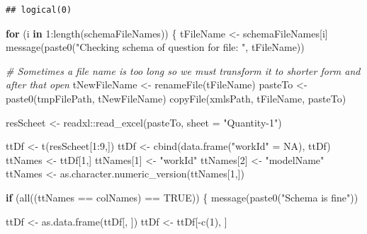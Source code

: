 \documentclass[
]{article}
\newenvironment{Shaded}{\begin{snugshade}}{\end{snugshade}}
\newcommand{\AttributeTok}[1]{\textcolor[rgb]{0.77,0.63,0.00}{#1}}
\newcommand{\CommentTok}[1]{\textcolor[rgb]{0.56,0.35,0.01}{\textit{#1}}}
\newcommand{\ConstantTok}[1]{\textcolor[rgb]{0.00,0.00,0.00}{#1}}
\newcommand{\ControlFlowTok}[1]{\textcolor[rgb]{0.13,0.29,0.53}{\textbf{#1}}}
\newcommand{\DecValTok}[1]{\textcolor[rgb]{0.00,0.00,0.81}{#1}}
\newcommand{\FunctionTok}[1]{\textcolor[rgb]{0.00,0.00,0.00}{#1}}
\newcommand{\NormalTok}[1]{#1}
\newcommand{\OtherTok}[1]{\textcolor[rgb]{0.56,0.35,0.01}{#1}}
\newcommand{\SpecialCharTok}[1]{\textcolor[rgb]{0.00,0.00,0.00}{#1}}
\newcommand{\StringTok}[1]{\textcolor[rgb]{0.31,0.60,0.02}{#1}}
\begin{document}
\begin{verbatim}
## logical(0)
\end{verbatim}

\begin{Shaded}
\begin{Highlighting}[]
\ControlFlowTok{for}\NormalTok{ (i }\ControlFlowTok{in} \DecValTok{1}\SpecialCharTok{:}\FunctionTok{length}\NormalTok{(schemaFileNames)) \{}
\NormalTok{  tFileName }\OtherTok{\textless{}{-}}\NormalTok{ schemaFileNames[i]}
  \FunctionTok{message}\NormalTok{(}\FunctionTok{paste0}\NormalTok{(}\StringTok{"Checking schema of question for file: "}\NormalTok{, tFileName))}
  
  \CommentTok{\# Sometimes a file name is too long so we must transform it to shorter form and after that open}
\NormalTok{  tNewFileName }\OtherTok{\textless{}{-}} \FunctionTok{renameFile}\NormalTok{(tFileName)}
\NormalTok{  pasteTo }\OtherTok{\textless{}{-}} \FunctionTok{paste0}\NormalTok{(tmpFilePath, tNewFileName)}
  \FunctionTok{copyFile}\NormalTok{(xmlsPath, tFileName, pasteTo)}
  
\NormalTok{  resScheet }\OtherTok{\textless{}{-}}\NormalTok{ readxl}\SpecialCharTok{::}\FunctionTok{read\_excel}\NormalTok{(pasteTo, }\AttributeTok{sheet =} \StringTok{"Quantity{-}1"}\NormalTok{)}
  
\NormalTok{  ttDf }\OtherTok{\textless{}{-}} \FunctionTok{t}\NormalTok{(resScheet[}\DecValTok{1}\SpecialCharTok{:}\DecValTok{9}\NormalTok{,])}
\NormalTok{  ttDf }\OtherTok{\textless{}{-}} \FunctionTok{cbind}\NormalTok{(}\FunctionTok{data.frame}\NormalTok{(}\StringTok{"workId"} \OtherTok{=} \ConstantTok{NA}\NormalTok{), ttDf)}
\NormalTok{  ttNames }\OtherTok{\textless{}{-}}\NormalTok{ ttDf[}\DecValTok{1}\NormalTok{,]}
\NormalTok{  ttNames[}\DecValTok{1}\NormalTok{] }\OtherTok{\textless{}{-}} \StringTok{"workId"}
\NormalTok{  ttNames[}\DecValTok{2}\NormalTok{] }\OtherTok{\textless{}{-}} \StringTok{"modelName"}
\NormalTok{  ttNames }\OtherTok{\textless{}{-}} \FunctionTok{as.character.numeric\_version}\NormalTok{(ttNames[}\DecValTok{1}\NormalTok{,])}
  
  \ControlFlowTok{if}\NormalTok{ (}\FunctionTok{all}\NormalTok{((ttNames }\SpecialCharTok{==}\NormalTok{ colNames) }\SpecialCharTok{==} \ConstantTok{TRUE}\NormalTok{)) \{}
    \FunctionTok{message}\NormalTok{(}\FunctionTok{paste0}\NormalTok{(}\StringTok{"Schema is fine"}\NormalTok{))}
    
\NormalTok{    ttDf }\OtherTok{\textless{}{-}} \FunctionTok{as.data.frame}\NormalTok{(ttDf[, ])}
\NormalTok{    ttDf }\OtherTok{\textless{}{-}}\NormalTok{ ttDf[}\SpecialCharTok{{-}}\FunctionTok{c}\NormalTok{(}\DecValTok{1}\NormalTok{), ]}
    

\end{Highlighting}
\end{Shaded}
\end{document}
